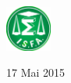 \begin{titlepage}
\begin{center}
\vfill

~\vspace*{14mm}

\begin{minipage}[t]{0.48\textwidth}
  \begin{flushleft}
    \centering \includegraphics [width=15mm]{images/logo-isfa.jpg} \\[0.5cm]
    \begin{spacing}{1.5}
    \end{spacing}
  \end{flushleft}
\end{minipage}


{\large 17 Mai 2015}

\end{center}

\end{titlepage}
